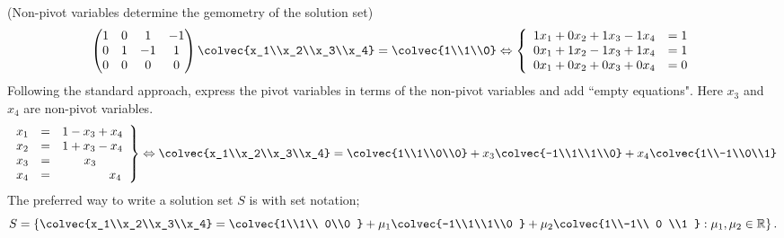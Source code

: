 \begin{example}\label{npcd} (Non-pivot variables determine the gemometry of the solution set)
\[\begin{pmatrix}
1 &  0 & 1 & -1 \\ 
 0 & 1 & -1& 1  \\
 0 &0   & 0  & 0 \\
\end{pmatrix}
\colvec{x_1\\x_2\\x_3\\x_4} 
=
\colvec{1\\1\\0} 
\Leftrightarrow
\left\{
\begin{array}{lcr}
	1x_1 +0x_2+ 1x_3 - 1x_4 & = 1 \\
	0x_1 +1x_2 - 1x_3 + 1x_4 & = 1 \\
	0x_1 +0x_2 + 0x_3 + 0x_4 & = 0 
\end{array}
     \right.
\]
Following the standard approach, express the pivot variables in terms of the non-pivot variables and add ``empty equations". Here $x_3$ and $x_4$ are non-pivot variables.  
\begin{eqnarray*}
\left.
\begin{array}{rcl}
	x_1 & = &1 -x_3+x_4 \\
	x_2 & = &1 +x_3-x_4 \\
	x_3 & = &\phantom{1+~\,}x_3\\
	x_4 & =&\phantom{1+x_3+~}x_4         
\end{array}
     \right\}
     \Leftrightarrow
\colvec{x_1\\x_2\\x_3\\x_4} 
= \colvec{1\\1\\0\\0} + x_3\colvec{-1\\1\\1\\0} + x_4\colvec{1\\-1\\0\\1}
\end{eqnarray*}
The preferred way to write a solution set $S$ is with set notation;  \[S = \left\{\colvec{x_1\\x_2\\x_3\\x_4} = \colvec{1\\1\\ 0\\0 } + \mu_1 \colvec{-1\\1\\1\\0 }  + \mu_2  \colvec{1\\-1\\ 0 \\1 } : \mu_1,\mu_2\in  {\mathbb R} \right\} .\]

\end{example}
